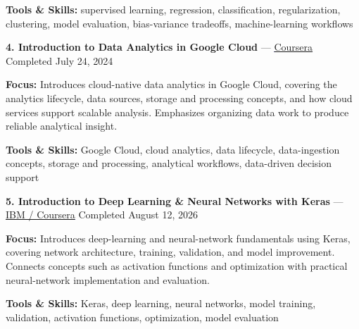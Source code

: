 \documentclass[9pt,letterpaper]{extarticle}
\begin{document}
{\small\textbf{Tools \& Skills:} supervised learning, regression, classification, regularization, clustering, model evaluation, bias-variance tradeoffs, machine-learning workflows\par}
\vspace{2pt}
\noindent\textbf{4. Introduction to Data Analytics in Google Cloud} {\small --- \textcolor{blue}{\underline{\href{https://www.coursera.org/account/accomplishments/verify/R9FGPRZ3NJE8}{Coursera}}} \textbar{} Completed \textbar{} July 24, 2024}\par
\textbf{Focus:} Introduces cloud-native data analytics in Google Cloud, covering the analytics lifecycle, data sources, storage and processing concepts, and how cloud services support scalable analysis. Emphasizes organizing data work to produce reliable analytical insight.\par
{\small\textbf{Tools \& Skills:} Google Cloud, cloud analytics, data lifecycle, data-ingestion concepts, storage and processing, analytical workflows, data-driven decision support\par}
\vspace{2pt}
\noindent\textbf{5. Introduction to Deep Learning \& Neural Networks with Keras} {\small --- \textcolor{blue}{\underline{\href{https://www.coursera.org/account/accomplishments/verify/Y6NP4GWLS4DZ}{IBM / Coursera}}} \textbar{} Completed \textbar{} August 12, 2026}\par
\textbf{Focus:} Introduces deep-learning and neural-network fundamentals using Keras, covering network architecture, training, validation, and model improvement. Connects concepts such as activation functions and optimization with practical neural-network implementation and evaluation.\par
{\small\textbf{Tools \& Skills:} Keras, deep learning, neural networks, model training, validation, activation functions, optimization, model evaluation\par}
\vspace{2pt}
\end{document}
